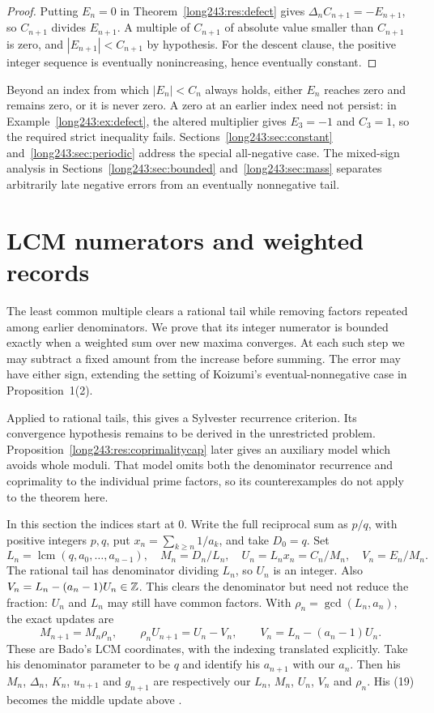 \documentclass[11pt]{article}
\begin{document}
\begin{proof}
Putting $E_n=0$ in Theorem~\ref{long243:res:defect} gives
$\Delta_n C_{n+1}=-E_{n+1}$, so $C_{n+1}$ divides $E_{n+1}$.  A multiple of
$C_{n+1}$ of absolute value smaller than $C_{n+1}$ is zero, and
$|E_{n+1}|<C_{n+1}$ by hypothesis. For the descent clause, the positive
integer sequence is eventually nonincreasing, hence eventually constant.
\end{proof}

Beyond an index from which $|E_n|<C_n$ always holds, either $E_n$
reaches zero and remains zero, or it is never zero. A zero at an earlier
index need not persist: in Example~\ref{long243:ex:defect}, the altered
multiplier gives $E_3=-1$ and $C_3=1$, so the required strict inequality
fails.
Sections~\ref{long243:sec:constant} and~\ref{long243:sec:periodic} address
the special all-negative case. The mixed-sign analysis in
Sections~\ref{long243:sec:bounded} and~\ref{long243:sec:mass} separates
arbitrarily late negative errors from an eventually nonnegative tail.

\section{LCM numerators and weighted records}\label{long243:sec:lcmrecords}

The least common multiple clears a rational tail while removing
factors repeated among earlier denominators. We prove that its integer
numerator is bounded exactly when a weighted sum over new maxima
converges. At each such step we may subtract a fixed amount from the
increase before summing. The error may have either sign, extending
the setting of Koizumi's eventual-nonnegative case in Proposition~1(2).

Applied to rational tails, this gives a Sylvester recurrence criterion.
Its convergence hypothesis remains to be derived in the unrestricted
problem. Proposition~\ref{long243:res:coprimalitycap} later gives an
auxiliary model which avoids whole moduli. That model omits both the
denominator recurrence and coprimality to the individual prime factors,
so its counterexamples do not apply to the theorem here.

In this section the indices start at $0$. Write the full reciprocal
sum as $p/q$, with positive integers $p,q$, put $x_n=\sum_{k\ge n}1/a_k$, and take
$D_0=q$. Set
\[
 L_n=\operatorname{lcm}(q,a_0,\ldots,a_{n-1}),\quad
 M_n=D_n/L_n,\quad U_n=L_nx_n=C_n/M_n,\quad V_n=E_n/M_n.
\]
The rational tail has denominator dividing $L_n$, so $U_n$ is an integer.
Also $V_n=L_n-(a_n-1)U_n\in\mathbb{Z}$. This clears the denominator but need
not reduce the fraction: $U_n$ and $L_n$ may still have common factors.
With $\rho_n=\gcd(L_n,a_n)$, the exact updates are
\[
 M_{n+1}=M_n\rho_n,\qquad
 \rho_nU_{n+1}=U_n-V_n,\qquad V_n=L_n-(a_n-1)U_n.
\]
These are Bado's LCM coordinates, with the indexing translated explicitly.
Take his denominator parameter to be $q$ and identify his $a_{n+1}$
with our $a_n$. Then his $M_n$, $\Delta_n$, $K_n$, $u_{n+1}$ and
$g_{n+1}$ are respectively our $L_n$, $M_n$, $U_n$, $V_n$ and $\rho_n$.
His (19) becomes the middle update above
\cite[Prop.~7.1 and (16)--(20), pp.~6--7]{bado2026}.
\end{document}
